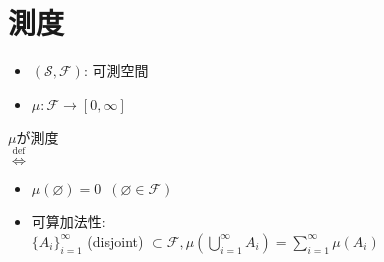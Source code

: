 \documentclass[aspectratio=169, dvipdfmx, 11pt]{beamer}
\begin{document}
\section{測度}
\begin{frame}
    \begin{tcolorbox}[
            colframe = red,
            colback = red!5!white,
            colbacktitle = red,
            coltitle = white,
            fonttitle = \bfseries,
            rightrule = 0pt,
            leftrule = 0pt,
            bottomrule = 0pt,
            arc = 0pt,
            title = Def 1.5. 測度
        ]
        {
            \begin{tcolorbox}
                \begin{itemize}
                    \item $\mathcal{(S, F)}$: 可測空間\\
                    \item $\mu: \mathcal{F} \rightarrow [0, \infty]$
                \end{itemize}
            \end{tcolorbox}
            $\mu$が測度\\
            $\overset{\text{def}}{\Longleftrightarrow}$
            \begin{itemize}
                \item $\mu(\varnothing) = 0 \,\,\,(\varnothing \in \mathcal{F})$
                \item 可算加法性:\\
                      $\{A_{i}\}_{i = 1}^{\infty}$ (disjoint) $\subset \mathcal{F},
                          \mu\left(\bigcup_{i = 1}^{\infty} A_{i}\right) = \sum_{i = 1}^{\infty}\mu(A_{i})$
            \end{itemize}
        }
    \end{tcolorbox}
\end{frame}
\end{document}
